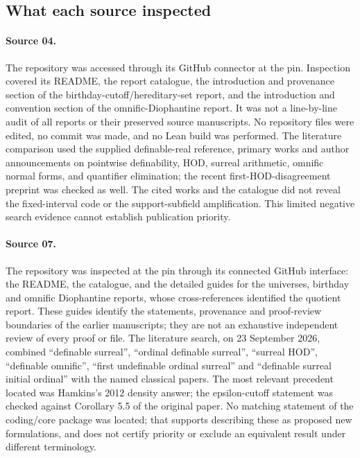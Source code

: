 \documentclass[11pt,a4paper]{article}
\numberwithin{equation}{section}
\theoremstyle{definition}
\theoremstyle{remark}
\newcommand{\HOD}{\mathrm{HOD}}
\begin{document}
\subsection{What each source inspected}\label{dsn:app:inspected}

\paragraph{Source 04.} The repository was accessed through its GitHub
connector at the pin. Inspection covered its README, the report catalogue,
the introduction and provenance section of the birthday-cutoff/hereditary-set
report, and the introduction and convention section of the
omnific-Diophantine report. It was not a line-by-line audit of all reports
or their preserved source manuscripts. No repository files were edited, no
commit was made, and no Lean build was performed. The literature comparison
used the supplied definable-real reference, primary works and author
announcements on pointwise definability, $\HOD$, surreal arithmetic,
omnific normal forms, and quantifier elimination; the recent
first-$\HOD$-disagreement preprint was checked as well. The cited works and
the catalogue did not reveal the fixed-interval code or the support-subfield
amplification. This limited negative search evidence cannot establish
publication priority.

\paragraph{Source 07.} The repository was inspected at the pin through its
connected GitHub interface: the README, the catalogue, and the detailed
guides for the universes, birthday and omnific Diophantine reports, whose
cross-references identified the quotient report. These guides identify the
statements, provenance and proof-review boundaries of the earlier
manuscripts; they are not an exhaustive independent review of every proof
or file. The literature search, on 23 September 2026, combined ``definable
surreal'', ``ordinal definable surreal'', ``surreal HOD'', ``definable
omnific'', ``first undefinable ordinal surreal'' and ``definable surreal
initial ordinal'' with the named classical papers. The most relevant
precedent located was Hamkins's 2012 density answer; the epsilon-cutoff
statement was checked against Corollary 5.5 of the original paper. No
matching statement of the coding/core package was located; that supports
describing these as proposed new formulations, and does not certify
priority or exclude an equivalent result under different terminology.
\end{document}
